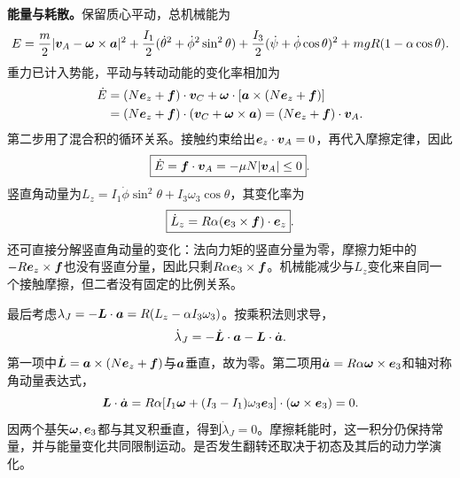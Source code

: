 \begin{solution}
\textbf{能量与耗散。}保留质心平动，总机械能为
\[
 E=\frac m2|\bm{v}_A-\bm{\omega}\times\bm{a}|^2
 +\frac{I_1}{2}(\dot\theta^2+\dot\phi^2\sin^2\theta)
 +\frac{I_3}{2}(\dot\psi+\dot\phi\cos\theta)^2
 +mgR(1-\alpha\cos\theta).
\]
重力已计入势能，平动与转动动能的变化率相加为
\[
\begin{aligned}
\dot E&=(N\bm{e}_z+\bm{f})\cdot\bm{v}_C
+\bm{\omega}\cdot[\bm{a}\times(N\bm{e}_z+\bm{f})]\\
&=(N\bm{e}_z+\bm{f})\cdot(\bm{v}_C+\bm{\omega}\times\bm{a})
=(N\bm{e}_z+\bm{f})\cdot\bm{v}_A.
\end{aligned}
\]
第二步用了混合积的循环关系。接触约束给出$\bm{e}_z\cdot\bm{v}_A=0$，再代入摩擦定律，因此
\[
 \boxed{\dot E=\bm{f}\cdot\bm{v}_A=-\mu N|\bm{v}_A|\le0}.
\]
竖直角动量为$L_z=I_1\dot\phi\sin^2\theta+I_3\omega_3\cos\theta$，其变化率为
\[
 \boxed{\dot L_z=R\alpha(\bm{e}_3\times\bm{f})\cdot\bm{e}_z}.
\]
还可直接分解竖直角动量的变化：法向力矩的竖直分量为零，摩擦力矩中的$-R\bm{e}_z\times\bm{f}$也没有竖直分量，因此只剩$R\alpha\bm{e}_3\times\bm{f}$。机械能减少与$L_z$变化来自同一个接触摩擦，但二者没有固定的比例关系。

最后考虑$\lambda_J=-\bm{L}\cdot\bm{a}=R(L_z-\alpha I_3\omega_3)$。按乘积法则求导，
\[
\dot\lambda_J=-\dot{\bm{L}}\cdot\bm{a}-\bm{L}\cdot\dot{\bm{a}}.
\]
第一项中$\dot{\bm{L}}=\bm{a}\times(N\bm{e}_z+\bm{f})$与$\bm{a}$垂直，故为零。第二项用$\dot{\bm{a}}=R\alpha\bm{\omega}\times\bm{e}_3$和轴对称角动量表达式，
\[
\bm{L}\cdot\dot{\bm{a}}
=R\alpha[I_1\bm{\omega}+(I_3-I_1)\omega_3\bm{e}_3]
\cdot(\bm{\omega}\times\bm{e}_3)=0.
\]
因两个基矢$\bm{\omega},\bm{e}_3$都与其叉积垂直，得到$\dot\lambda_J=0$。摩擦耗能时，这一积分仍保持常量，并与能量变化共同限制运动。是否发生翻转还取决于初态及其后的动力学演化。


\end{solution}



